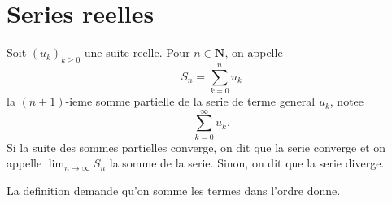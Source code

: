 \chapter{Series reelles}
\begin{definition}
Soit $(u_{k})_{k\ge 0}$ une suite reelle. Pour $n\in \mathbf{N}$, on appelle
$$
S_{n}=\sum_{k=0}^{n} u_{k}
$$
la $(n+1)$-ieme somme partielle de la serie de terme general $u_{k}$, notee
$$
\sum_{k=0}^{\infty} u_{k}.
$$
Si la suite des sommes partielles converge, on dit que la serie converge et on appelle $\lim_{ n \to \infty }S_{n}$ la somme de la serie. Sinon, on dit que la serie diverge.
\end{definition}
\begin{remark}
La definition demande qu'on somme les termes dans l'ordre donne.
\end{remark}
